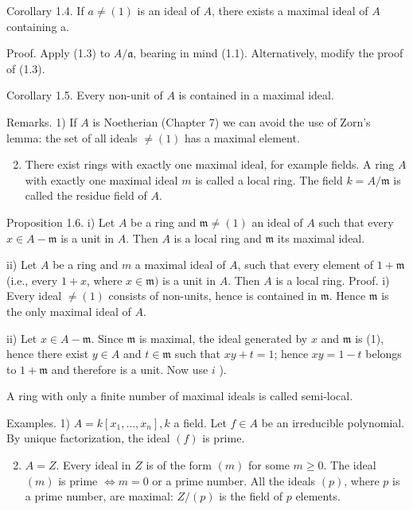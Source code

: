 \documentclass{standalone}
\theoremstyle{definition}
\theoremstyle{remark}
\begin{document}
Corollary 1.4. If $a \neq(1)$ is an ideal of $A$, there exists a maximal ideal of $A$ containing a.

Proof. Apply (1.3) to $A / \mathfrak{a}$, bearing in mind (1.1). Alternatively, modify the proof of (1.3).

Corollary 1.5. Every non-unit of $A$ is contained in a maximal ideal.

Remarks. 1) If $A$ is Noetherian (Chapter 7) we can avoid the use of Zorn's lemma: the set of all ideals $\neq(1)$ has a maximal element.

\begin{enumerate}
  \setcounter{enumi}{1}
  \item There exist rings with exactly one maximal ideal, for example fields. A ring $A$ with exactly one maximal ideal $m$ is called a local ring. The field $k=A / \mathfrak{m}$ is called the residue field of $A$.
\end{enumerate}

Proposition 1.6. i) Let $A$ be a ring and $\mathfrak{m} \neq(1)$ an ideal of $A$ such that every $x \in A-\mathfrak{m}$ is a unit in $A$. Then $A$ is a local ring and $\mathfrak{m}$ its maximal ideal.

ii) Let $A$ be a ring and $m$ a maximal ideal of $A$, such that every element of $1+\mathfrak{m}$ (i.e., every $1+x$, where $x \in \mathfrak{m})$ is a unit in $A$. Then $A$ is a local ring. Proof. i) Every ideal $\neq(1)$ consists of non-units, hence is contained in $\mathfrak{m}$. Hence $\mathfrak{m}$ is the only maximal ideal of $A$.

ii) Let $x \in A-\mathfrak{m}$. Since $\mathfrak{m}$ is maximal, the ideal generated by $x$ and $\mathfrak{m}$ is (1), hence there exist $y \in A$ and $t \in \mathfrak{m}$ such that $x y+t=1$; hence $x y=1-t$ belongs to $1+\mathfrak{m}$ and therefore is a unit. Now use $i$ ).

A ring with only a finite number of maximal ideals is called semi-local.

Examples. 1) $A=k\left[x_{1}, \ldots, x_{n}\right], k$ a field. Let $f \in A$ be an irreducible polynomial. By unique factorization, the ideal $(f)$ is prime.

\begin{enumerate}
  \setcounter{enumi}{1}
  \item $A=Z$. Every ideal in $Z$ is of the form $(m)$ for some $m \geqslant 0$. The ideal $(m)$ is prime $\Leftrightarrow m=0$ or a prime number. All the ideals $(p)$, where $p$ is a prime number, are maximal: $Z /(p)$ is the field of $p$ elements.
\end{enumerate}
\end{document}
